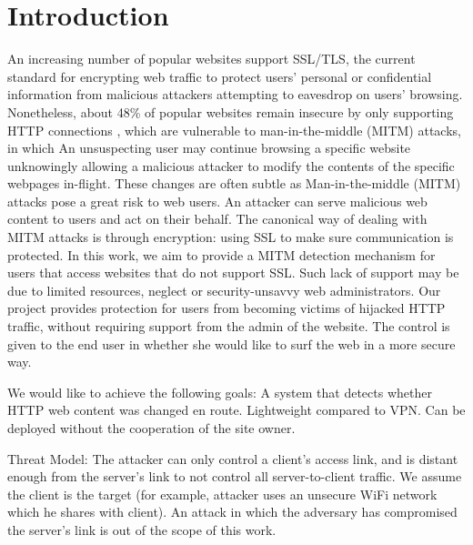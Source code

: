 \section{Introduction}
\label{sec:intro}


An increasing number of popular websites support SSL/TLS, the current standard for encrypting web traffic to protect users' personal or confidential information from malicious attackers attempting to eavesdrop on users' browsing. 
Nonetheless, about 48\% of popular websites remain insecure by only supporting HTTP connections \cite{ssl_pulse}, which are vulnerable to man-in-the-middle (MITM) attacks, in which 
An unsuspecting user may continue browsing a specific website unknowingly allowing a malicious attacker to modify the contents of the specific webpages in-flight.
These changes are often subtle as \cite{tripwires}
Man-in-the-middle (MITM) attacks pose a great risk to web users. 
An attacker can serve malicious web content to users and act on their behalf. 
The canonical way of dealing with MITM attacks is through encryption: using SSL to make sure communication is protected. 
In this work, we aim to provide a MITM detection mechanism for users that access websites that do not support SSL. 
Such lack of support may be due to limited resources, neglect or security-unsavvy web administrators. 
Our project provides protection for users from becoming victims of hijacked HTTP traffic, without requiring support from the admin of the website. 
The control is given to the end user in whether she would like to surf the web in a more secure way.

We would like to achieve the following goals:
A system that detects whether HTTP web content was changed en route.
Lightweight compared to VPN.
Can be deployed without the cooperation of the site owner.

Threat Model:
The attacker can only control a client’s access link, and is distant enough from the server’s link to not control all server-to-client traffic. We assume the client is the target (for example, attacker uses an unsecure WiFi network which he shares with client).
An attack in which the adversary has compromised the server’s link is out of the scope of this work.